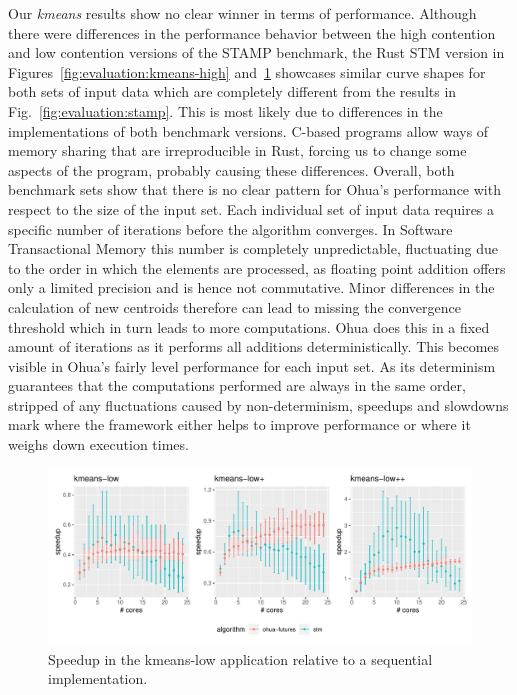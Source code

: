 Our \emph{kmeans} results show no clear winner in terms of performance.
Although there were differences in the performance behavior between the high contention and low contention versions of the STAMP benchmark, the Rust STM version in Figures~\ref{fig:evaluation:kmeans-high} and~\ref{fig:evaluation:kmeans-low} showcases similar curve shapes for both sets of input data which are completely different from the results in Fig.~\ref{fig:evaluation:stamp}.
This is most likely due to differences in the implementations of both benchmark versions.
C-based programs allow ways of memory sharing that are irreproducible in Rust, forcing us to change some aspects of the program, probably causing these differences.
Overall, both benchmark sets show that there is no clear pattern for Ohua's performance with respect to the size of the input set.
Each individual set of input data requires a specific number of iterations before the algorithm converges.
In Software Transactional Memory this number is completely unpredictable, fluctuating due to the order in which the elements are processed, as floating point addition offers only a limited precision and is hence not commutative.
Minor differences in the calculation of new centroids therefore can lead to missing the convergence threshold which in turn leads to more computations.
Ohua does this in a fixed amount of iterations as it performs all additions deterministically.
This becomes visible in Ohua's fairly level performance for each input set.
As its determinism guarantees that the computations performed are always in the same order, stripped of any fluctuations caused by non-determinism, speedups and slowdowns mark where the framework either helps to improve performance or where it weighs down execution times.

\begin{figure}
    \centering
    \includegraphics[width=\textwidth,keepaspectratio]{gfx/results/kmeans-low_comb}
    \caption{Speedup in the kmeans-low application relative to a sequential implementation.}%
    \label{fig:evaluation:kmeans-low}
\end{figure}

